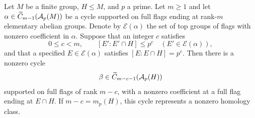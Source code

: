 \begin{lemma}\label{lem:restriction}
Let $M$ be a finite group, $H\leq M$, and $p$ a prime. Let
$m\geq1$ and let $\alpha\in\widetilde C_{m-1}(\mathcal A_p(M))$
be a cycle supported on full flags ending at rank-$m$
elementary abelian groups. Denote by $\mathcal E(\alpha)$
the set of top groups of flags with nonzero coefficient in
$\alpha$. Suppose that an integer $c$ satisfies
\[
 0\leq c<m,
 \qquad [E':E'\cap H]\leq p^c
      \quad(E'\in\mathcal E(\alpha)),
\]
and that a specified $E\in\mathcal E(\alpha)$ satisfies
$[E:E\cap H]=p^c$. Then there is a nonzero cycle
\[
 \beta\in\widetilde C_{m-c-1}(\mathcal A_p(H))
\]
supported on full flags of rank $m-c$, with a nonzero
coefficient at a full flag ending at $E\cap H$.
If $m-c=m_p(H)$, this cycle represents a nonzero homology class.
\end{lemma}

